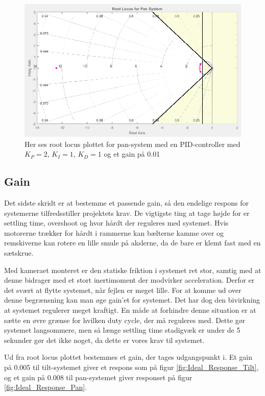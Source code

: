 \begin{figure}[ht]
	\begin{center}
		\includegraphics[scale=0.45]{Billeder/Pan_Rlocus.PNG}
	\end{center}
\caption{Her ses root locus plottet for pan-system med en PID-controller med $K_{P}=2$, $K_{I}=1$, $K_{D}=1$ og et gain på 0.01}
\label{fig:Pan_rlocus}
\end{figure}

\subsection{Gain}

Det sidste skridt er at bestemme et passende gain, så den endelige respons for systemerne tilfredsstiller projektets krav. De vigtigste ting at tage højde for er settling time, overshoot og hvor hårdt der reguleres med systemet. Hvis motorerne trækker for hårdt i rammerne kan bælterne kamme over og remskiverne kan rotere en lille smule på akslerne, da de bare er klemt fast med en sætskrue. 

Med kameraet monteret er den statiske friktion i systemet ret stor, samtig med at denne bidrager med et stort inertimoment der modvirker acceleration. Derfor er det svært at flytte systemet, når fejlen er meget lille. For at komme ud over denne begrænsning kan man øge gain'et for systemet. Det har dog den bivirkning at systemet regulerer meget kraftigt. En måde at forhindre denne situation er at sætte en øvre grænse for hvilken duty cycle, der må reguleres med. Dette gør systemet langsommere, men så længe settling time stadigvæk er under de 5 sekunder gør det ikke noget, da dette er vores krav til systemet.

Ud fra root locus plottet bestemmes et gain, der tages udgangspunkt i. Et gain på 0.005 til tilt-systemet giver et respons som på figur \ref{fig:Ideal_Response_Tilt}, og et gain på 0.008 til pan-systemet giver responset på figur \ref{fig:Ideal_Response_Pan}. 

